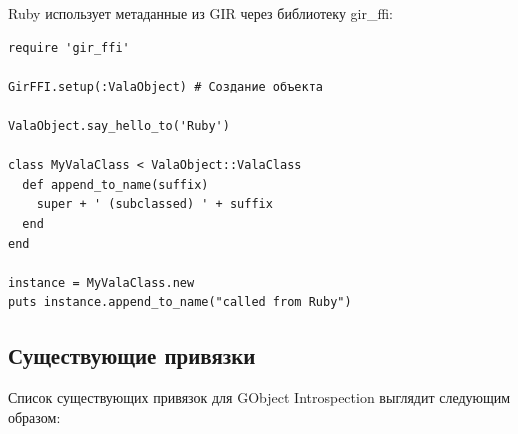 \documentclass[10pt, a5paper]{article}
\begin{document}
Ruby использует метаданные из GIR через библиотеку gir\_ffi:

\begin{verbatim}
require 'gir_ffi'

GirFFI.setup(:ValaObject) # Создание объекта

ValaObject.say_hello_to('Ruby')

class MyValaClass < ValaObject::ValaClass
  def append_to_name(suffix)
    super + ' (subclassed) ' + suffix
  end
end

instance = MyValaClass.new
puts instance.append_to_name("called from Ruby")
\end{verbatim}

\subsection*{Существующие привязки}

Список существующих привязок для GObject Introspection выглядит следующим образом:
\end{document}
